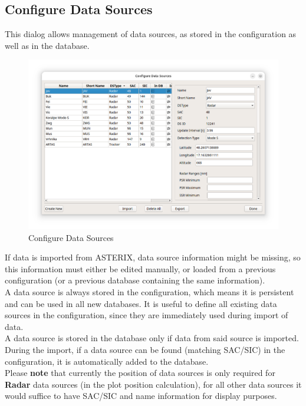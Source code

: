\subsection{Configure Data Sources}
\label{sec:ui_configure_data_sources}

This dialog allows management of data sources, as stored in the configuration as well as in the database. \\

\begin{figure}[H]
    \hspace*{-2cm}
    \includegraphics[width=18cm]{figures/configure_data_sources.png}
  \caption{Configure Data Sources}
\end{figure}

If data is imported from ASTERIX, data source information might be missing, so this information must either be edited manually, or loaded from a previous configuration (or a previous database containing the same information). \\

A data source is always stored in the configuration, which means it is persistent and can be used in all new databases. 
It is useful to define all existing data sources in the configuration, since they are immediately used during import of data. \\

A data source is stored in the database only if data from said source is imported. 
During the import, if a data source can be found (matching SAC/SIC) in the configuration, it is automatically added to the database. \\

Please \textbf{note} that currently the position of data sources is only required for \textbf{Radar} data sources (in the plot position calculation), for all other data sources it would suffice to have SAC/SIC and name information for display purposes. \\

